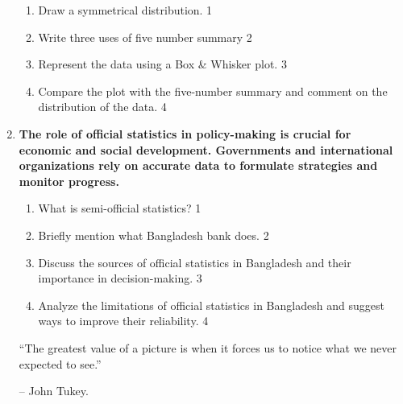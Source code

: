 \documentclass{article}
\begin{document}
\begin{enumerate}
\begin{enumerate}
    \item Draw a symmetrical distribution.   \hfill 1
    \item Write three uses of five number summary \hfill 2
    \item  
    Represent the data using a Box \& Whisker plot. \hfill 3
    \item
    Compare the plot with the five-number summary and comment on the distribution of the data. \hfill 4
\end{enumerate}



  \item
\textbf{The role of official statistics in policy-making is crucial for economic and social development. Governments and international organizations rely on accurate data to formulate strategies and monitor progress.}

\begin{enumerate}
   \item What is semi-official statistics?  \hfill 1
 \item Briefly mention what Bangladesh bank does.  \hfill 2
    \item  
    Discuss the sources of official statistics in Bangladesh and their importance in decision-making. \hfill 3
    \item
    Analyze the limitations of official statistics in Bangladesh and suggest ways to improve their reliability. \hfill 4
\end{enumerate}


\vspace{3cm}

\begin{center}
 “The greatest value of a picture is when it forces us to notice what we never expected to see.” \\ \end{center}
\hfill – John Tukey.

  
\end{enumerate}
\end{document}
